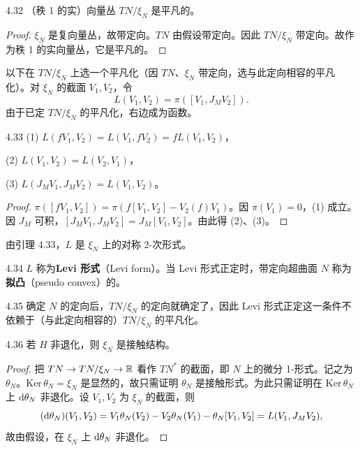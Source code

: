 \begin{lemma*}{4.32}
  （秩 1 的实）向量丛 $TN/\xi_N$ 是平凡的。
\end{lemma*}
\begin{proof}
  $\xi_N$ 是复向量丛，故带定向。$TN$ 由假设带定向。因此 $TN/\xi_N$ 带定向。故作为秩 1 的实向量丛，它是平凡的。
\end{proof}

以下在 $TN/\xi_N$ 上选一个平凡化（因 $TN$、$\xi_N$ 带定向，选与此定向相容的平凡化）。对 $\xi_N$ 的截面 $V_1,V_2$，令
\[
  L(V_1,V_2)=\pi([V_1,J_MV_2]).
\]
由于已定 $TN/\xi_N$ 的平凡化，右边成为函数。

\begin{lemma*}{4.33}
  (1) $L(fV_1,V_2)=L(V_1,fV_2)=fL(V_1,V_2)$，

  (2) $L(V_1,V_2)=L(V_2,V_1)$，

  (3) $L(J_MV_1,J_MV_2)=L(V_1,V_2)$。
\end{lemma*}
\begin{proof}
  $\pi([fV_1,V_2])=\pi(f[V_1,V_2]-V_2(f)V_1)$。因 $\pi(V_1)=0$，(1) 成立。因 $J_M$ 可积，$[J_MV_1,J_MV_2]=J_M[V_1,V_2]$。由此得 (2)、(3)。
\end{proof}

由引理 4.33，$L$ 是 $\xi_N$ 上的对称 2-次形式。

\begin{definition}{4.34}
  $L$ 称为\textbf{Levi 形式}（Levi form）。当 Levi 形式正定时，带定向超曲面 $N$ 称为\textbf{拟凸}（pseudo convex）的。
\end{definition}

\begin{remark}{4.35}
  确定 $N$ 的定向后，$TN/\xi_N$ 的定向就确定了，因此 Levi 形式正定这一条件不依赖于（与此定向相容的）$TN/\xi_N$ 的平凡化。
\end{remark}

\begin{lemma*}{4.36}
  若 $H$ 非退化，则 $\xi_N$ 是接触结构。
\end{lemma*}
\begin{proof}
  把 $TN\to TN/\xi_N\to\mathbb{R}$ 看作 $TN^*$ 的截面，即 $N$ 上的微分 1-形式。记之为 $\theta_N$。$\mathrm{Ker}\,\theta_N=\xi_N$ 是显然的，故只需证明 $\theta_N$ 是接触形式。为此只需证明在 $\mathrm{Ker}\,\theta_N$ 上 $\mathrm{d}\theta_N$ 非退化。设 $V_1,V_2$ 为 $\xi_N$ 的截面，则
  \[
    (\mathrm{d}\theta_N)(V_1,V_2)=V_1\theta_N(V_2)-V_2\theta_N(V_1)-\theta_N[V_1,V_2]=L(V_1,J_MV_2),
  \]
  故由假设，在 $\xi_N$ 上 $\mathrm{d}\theta_N$ 非退化。
\end{proof}

